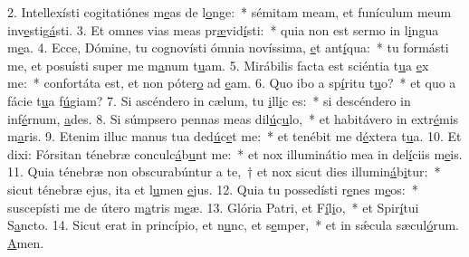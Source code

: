 2. Intellexísti cogitatiónes m\uline{e}as de l\uline{o}nge:~* sémitam meam, et funículum meum inv\uline{e}stig\uline{á}sti.
3. Et omnes vias meas pr\uline{æ}vid\uline{í}sti:~* quia non est sermo in l\uline{i}ngua m\uline{e}a.
4. Ecce, Dómine, tu cognovísti ómnia novíssima, \uline{e}t ant\uline{í}qua:~* tu formásti me, et posuísti super me m\uline{a}num t\uline{u}am.
5. Mirábilis facta est sciéntia t\uline{u}a \uline{e}x me:~* confortáta est, et non póter\uline{o} ad \uline{e}am.
6. Quo ibo a sp\uline{í}ritu t\uline{u}o?~* et quo a fácie t\uline{u}a f\uline{ú}giam?
7. Si ascéndero in cælum, tu \uline{i}ll\uline{i}c es:~* si descéndero in inf\uline{é}rnum, \uline{a}des.
8. Si súmpsero pennas meas dil\uline{ú}c\uline{u}lo,~* et habitávero in extr\uline{é}mis m\uline{a}ris.
9. Etenim illuc manus tua ded\uline{ú}c\uline{e}t me:~* et tenébit me d\uline{é}xtera t\uline{u}a.
10. Et dixi: Fórsitan ténebræ conculc\uline{á}b\uline{u}nt me:~* et nox illuminátio mea in del\uline{í}ciis m\uline{e}is.
11. Quia ténebræ non obscurabúntur a te,~† et nox sicut dies illumin\uline{á}b\uline{i}tur:~* sicut ténebræ ejus, ita et l\uline{u}men \uline{e}jus.
12. Quia tu possedísti r\uline{e}nes m\uline{e}os:~* suscepísti me de útero m\uline{a}tris m\uline{e}æ.
13. Glória Patri, et F\uline{í}l\uline{i}o,~* et Spir\uline{í}tui S\uline{a}ncto.
14. Sicut erat in princípio, et n\uline{u}nc, et s\uline{e}mper,~* et in sǽcula sæcul\uline{ó}rum. \uline{A}men.

